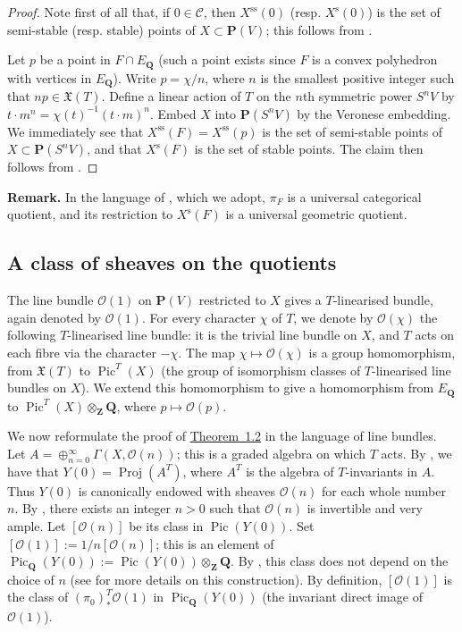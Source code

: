 \documentclass{article}
\newenvironment{rmenv}[1]
  {\phantomsection\par\medskip\noindent\textbf{#1.}\rmfamily}
  {\par\medskip}
\newcommand{\scr}[1]{{\mathscr{#1}}}
\newcommand{\PP}{\mathbf{P}}
\newcommand{\QQ}{\mathbf{Q}}
\newcommand{\ZZ}{\mathbf{Z}}
\newcommand{\s}{\mathrm{s}}
\renewcommand{\ss}{\mathrm{ss}}
\DeclareMathOperator{\Pic}{Pic}
\DeclareMathOperator{\Proj}{Proj}
\begin{document}
\begin{proof}
  Note first of all that, if $0\in\mathcal{C}$, then $X^\ss(0)$ (resp. $X^\s(0)$) is the set of semi-stable (resp. stable) points of $X\subset\PP(V)$;
  this follows from \cite[Theorem~2.1]{MF}.

  Let $p$ be a point in $F\cap E_\QQ$ (such a point exists since $F$ is a convex polyhedron with vertices in $E_\QQ$).
  Write $p=\chi/n$, where $n$ is the smallest positive integer such that $np\in\mathfrak{X}(T)$.
  Define a linear action of $T$ on the $n$th symmetric power $S^nV$ by $t\cdot m^n = \chi(t)^{-1}(t\cdot m)^n$.
  Embed $X$ into $\PP(S^nV)$ by the Veronese embedding.
  We immediately see that $X^\ss(F)=X^\ss(p)$ is the set of semi-stable points of $X\subset\PP(S^nV)$, and that $X^\s(F)$ is the set of stable points.
  The claim then follows from \cite[1.4]{MF}.
\end{proof}

\begin{rmenv}{Remark}
  In the language of \cite[Chapter~1]{MF}, which we adopt, $\pi_F$ is a universal categorical quotient, and its restriction to $X^\s(F)$ is a universal geometric quotient.
\end{rmenv}


\subsection{A class of sheaves on the quotients}
\label{1.3}

The line bundle $\scr{O}(1)$ on $\PP(V)$ restricted to $X$ gives a $T$-linearised bundle, again denoted by $\scr{O}(1)$.
For every character $\chi$ of $T$, we denote by $\scr{O}(\chi)$ the following $T$-linearised line bundle:
it is the trivial line bundle on $X$, and $T$ acts on each fibre via the character $-\chi$.
The map $\chi\mapsto\scr{O}(\chi)$ is a group homomorphism, from $\mathfrak{X}(T)$ to $\Pic^T(X)$ (the group of isomorphism classes of $T$-linearised line bundles on $X$).
We extend this homomorphism to give a homomorphism from $E_\QQ$ to $\Pic^T(X)\otimes_\ZZ\QQ$, where $p\mapsto\scr{O}(p)$.

We now reformulate the proof of \hyperref[1.2-theorem]{Theorem~1.2} in the language of line bundles.
Let $A=\oplus_{n=0}^\infty\Gamma(X,\scr{O}(n))$;
this is a graded algebra on which $T$ acts.
By \cite[1.11]{MF}, we have that $Y(0)=\Proj(A^T)$, where $A^T$ is the algebra of $T$-invariants in $A$.
Thus $Y(0)$ is canonically endowed with sheaves $\scr{O}(n)$ for each whole number $n$.
By \cite[8.14.4]{EGAII}, there exists an integer $n>0$ such that $\scr{O}(n)$ is invertible and very ample.
Let $[\scr{O}(n)]$ be its class in $\Pic(Y(0))$.
Set $[\scr{O}(1)] := 1/n[\scr{O}(n)]$;
this is an element of $\Pic_\QQ(Y(0)) := \Pic(Y(0))\otimes_\ZZ\QQ$.
By \cite[8.14.12]{EGAII}, this class does not depend on the choice of $n$ (see \cite{Dem} for more details on this construction).
By definition, $[\scr{O}(1)]$ is the class of $(\pi_0)_*^T\scr{O}(1)$ in $\Pic_\QQ(Y(0))$ (the invariant direct image of $\scr{O}(1)$).
\end{document}
